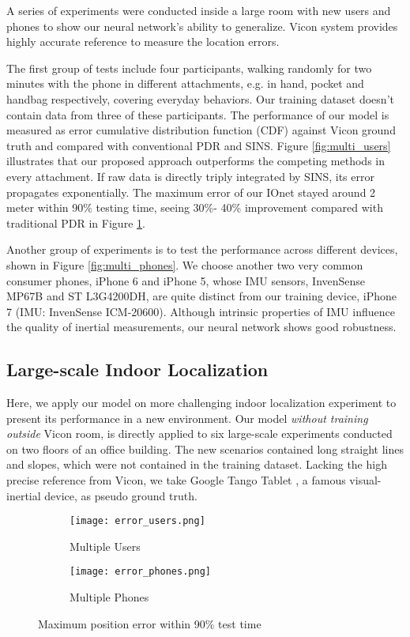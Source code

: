 \documentclass[letterpaper]{article}
\begin{document}
    A series of experiments were conducted inside a large room with new users and phones to show our neural network's ability to generalize. Vicon system provides highly accurate reference to measure the location errors.

    The first group of tests include four participants, walking randomly for two minutes with the phone in different attachments, e.g. in hand, pocket and handbag respectively, covering everyday behaviors. Our training dataset doesn't contain data from three of these participants. The performance of our model is measured as error cumulative distribution function (CDF) against Vicon ground truth and compared with conventional PDR and SINS. Figure \ref{fig:multi_users} illustrates that our proposed approach outperforms the competing methods in every attachment. If raw data is directly triply integrated by SINS, its error propagates exponentially. The maximum error of our IOnet stayed around 2 meter within 90\% testing time, seeing 30\%- 40\% improvement compared with traditional PDR in Figure \ref{fig:error_users}.

	Another group of experiments is to test the performance across different devices, shown in Figure \ref{fig:multi_phones}. We choose another two very common consumer phones, iPhone 6 and iPhone 5, whose IMU sensors, InvenSense MP67B and ST L3G4200DH, are quite distinct from our training device, iPhone 7 (IMU: InvenSense ICM-20600). Although intrinsic properties of IMU influence the quality of inertial measurements, our neural network shows good robustness.

\subsection{Large-scale Indoor Localization}

	Here, we apply our model on more challenging indoor localization experiment to present its performance in a new environment. Our model \textit{without training outside} Vicon room, is directly applied to six large-scale experiments conducted on two floors of an office building. The new scenarios contained long straight lines and slopes, which were not contained in the training dataset. Lacking the high precise reference from Vicon, we take Google Tango Tablet \cite{Tango}, a famous visual-inertial device, as pseudo ground truth.
  
     \begin{figure}
    	\centering
        \begin{subfigure}[t]{0.23\textwidth}
        	\texttt{[image: error\_users.png]}
        	\caption{\label{fig:error_users} Multiple Users}
        \end{subfigure}
        \begin{subfigure}[t]{0.23\textwidth}
        	\texttt{[image: error\_phones.png]}
        	\caption{\label{fig:error_phones} Multiple Phones}
        \end{subfigure}
        \caption{\label{fig:small_error}Maximum position error within 90\% test time}
    \end{figure}
\end{document}
